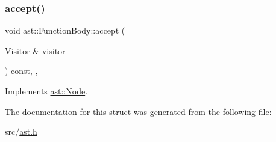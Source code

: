 \subsubsection{\texorpdfstring{accept()}{accept()}}
{\footnotesize\ttfamily void ast\+::\+Function\+Body\+::accept (\begin{DoxyParamCaption}\item[{\hyperlink{structast_1_1_visitor}{Visitor} \&}]{visitor }\end{DoxyParamCaption}) const\hspace{0.3cm}{\ttfamily [inline]}, {\ttfamily [override]}, {\ttfamily [virtual]}}



Implements \hyperlink{structast_1_1_node_abc089ee6caaf06a4445ebdd8391fdebc}{ast\+::\+Node}.



The documentation for this struct was generated from the following file\+:\begin{DoxyCompactItemize}
\item 
src/\hyperlink{ast_8h}{ast.\+h}\end{DoxyCompactItemize}
